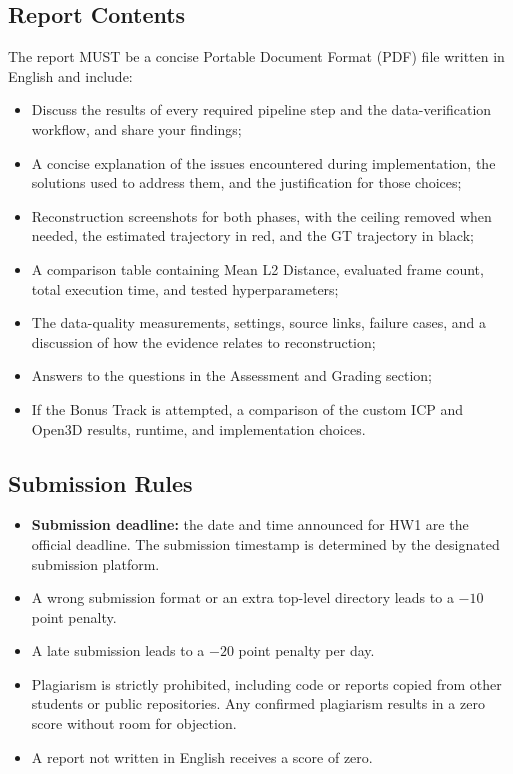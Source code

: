 \documentclass[11pt]{article}
\begin{document}
\subsection{Report Contents}
The report MUST be a concise Portable Document Format (PDF) file written in English and include:
\begin{itemize}
\item Discuss the results of every required pipeline step and the data-verification workflow, and share your findings;
\item A concise explanation of the issues encountered during implementation, the solutions used to address them, and the justification for those choices;
\item Reconstruction screenshots for both phases, with the ceiling removed when needed, the estimated trajectory in red, and the GT trajectory in black;
\item A comparison table containing Mean L2 Distance, evaluated frame count, total execution time, and tested hyperparameters;
\item The data-quality measurements, settings, source links, failure cases, and a discussion of how the evidence relates to reconstruction;
\item Answers to the questions in the Assessment and Grading section;
\item If the Bonus Track is attempted, a comparison of the custom ICP and Open3D results, runtime, and implementation choices.
\end{itemize}

\subsection{Submission Rules}
\begin{itemize}
\item \textbf{Submission deadline:} the date and time announced for HW1 are the official deadline. The submission timestamp is determined by the designated submission platform.
\item A wrong submission format or an extra top-level directory leads to a $-10$ point penalty.
\item A late submission leads to a $-20$ point penalty per day.
\item Plagiarism is strictly prohibited, including code or reports copied from other students or public repositories. Any confirmed plagiarism results in a zero score without room for objection.
\item A report not written in English receives a score of zero.
\end{itemize}
\end{document}
